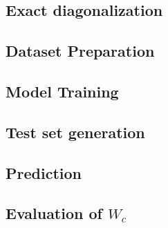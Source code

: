 \documentclass[reprint,amsmath,amssymb,aps,prb]{revtex4-2}
\begin{document}
\begin{widetext}
\subsection{Exact diagonalization}


\subsection{Dataset Preparation}


\subsection{Model Training}


\subsection{Test set generation}


\subsection{Prediction}


\subsection{Evaluation of $W_c$}




%
\end{widetext}
\end{document}

